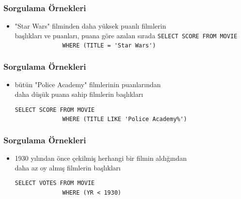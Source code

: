 \documentclass[dvipsnames]{beamer}
\theoremstyle{plain}
\begin{document}
\begin{frame}[fragile]
  \frametitle{Sorgulama Örnekleri}

  \begin{itemize}
    \item "Star Wars" filminden daha yüksek puanlı filmlerin\\
                başlıkları ve puanları, puana göre azalan sırada
    \medskip
{}
\lstinline!SELECT SCORE FROM MOVIE!\\
~~~~~~~~~~~~~~\lstinline!WHERE (TITLE = 'Star Wars')!
  \end{itemize}
\end{frame}

\begin{frame}[fragile]
  \frametitle{Sorgulama Örnekleri}

  \begin{itemize}
    \item bütün "Police Academy" filmlerinin puanlarından\\
                daha düşük puana sahip filmlerin başlıkları
                
    \medskip
{}
\lstinline!SELECT SCORE FROM MOVIE!\\
~~~~~~~~~~~~~~\lstinline!WHERE (TITLE LIKE 'Police Academy%')!
  \end{itemize}
\end{frame}

\begin{frame}[fragile]
  \frametitle{Sorgulama Örnekleri}

  \begin{itemize}
    \item 1930 yılından önce çekilmiş herhangi bir filmin aldığından\\
                daha az oy almış filmlerin başlıkları
    
    \medskip
{}
\lstinline!SELECT VOTES FROM MOVIE!\\
~~~~~~~~~~~~~~\lstinline!WHERE (YR < 1930)!
  \end{itemize}
\end{frame}
\end{document}
